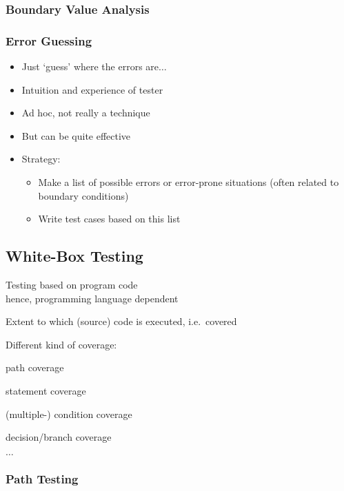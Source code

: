 
\subsubsection{Boundary Value Analysis}

\subsubsection{Error Guessing}

\begin{itemize}
	\item Just ‘guess’ where the errors are$\ldots$
	\item Intuition and experience of tester
	\item Ad hoc, not really a technique
	\item But can be quite effective
	\item Strategy:
	\begin{itemize}
		\item Make a list of possible errors or error-prone situations (often related to boundary conditions)
		\item Write test cases based on this list
	\end{itemize}
\end{itemize}

\subsection{White-Box Testing}

\begin{itemize*}
	\item Testing based on program code\\
	hence, programming language dependent
	\item Extent to which (source) code is executed, i.e.\ covered
	\item Different kind of coverage:
	\begin{itemize*}
		\item path coverage
		\item statement coverage
		\item (multiple-) condition coverage
		\item decision/branch coverage
		\item $\ldots$
	\end{itemize*}
\end{itemize*}

\subsubsection{Path Testing}

